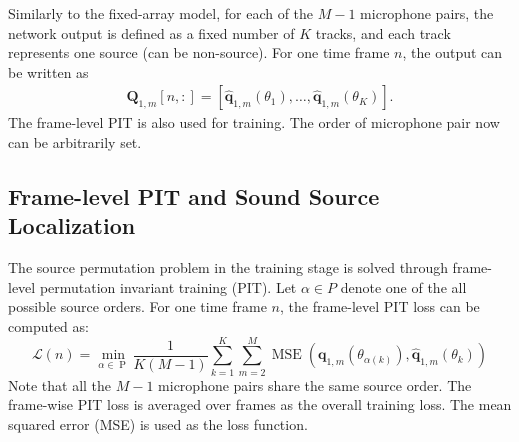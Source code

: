 \documentclass[lettersize,journal]{IEEEtran}
\begin{document}
Similarly to the fixed-array model, for each of the $M-1$ microphone pairs, the network output is defined as a fixed number of $K$ tracks, and each track represents one source (can be non-source). For one time frame $n$, the output can be written as
\begin{equation}
\begin{aligned}
        \mathbf{Q}_{1,m}[n,:] = [\mathbf{\hat{q}}_{1,m}(\theta_1), \dots,\mathbf{\hat{q}}_{1,m}(\theta_K)]. 
\end{aligned}
\end{equation}
The frame-level PIT is also used for training. The order of microphone pair now can be arbitrarily set. 


\subsection{Frame-level PIT and Sound Source Localization}
The source permutation problem in the training stage is solved through frame-level permutation invariant training (PIT). Let $\alpha\in P$ denote one of the all possible source orders. For one  time frame $n$, the frame-level PIT loss can be computed as:
\begin{equation}
\mathcal{L}(n)= \min _{\alpha \in \operatorname{P}} \frac{1}{K(M-1)} \sum_{k=1}^K \sum_{m=2}^M \operatorname{MSE}\left(\mathbf{q}_{1,m}(\theta_{\alpha(k)}), \hat{\mathbf{q}}_{1,m}(\theta_{{k}})\right)
\end{equation}
Note that all the $M-1$ microphone pairs share the same source order. The frame-wise PIT loss is averaged over frames as the overall training loss. The mean squared error (MSE) is used as the loss function.
\end{document}
